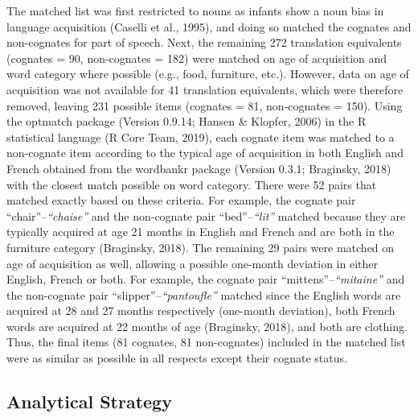 \documentclass[
  english,
  ,man,floatsintext]{apa6}
\begin{document}
The matched list was first restricted to nouns as infants show a noun bias in language acquisition (Caselli et al., 1995), and doing so matched the cognates and non-cognates for part of speech. Next, the remaining 272 translation equivalents (cognates = 90, non-cognates = 182) were matched on age of acquisition and word category where possible (e.g., food, furniture, etc.). However, data on age of acquisition was not available for 41 translation equivalents, which were therefore removed, leaving 231 possible items (cognates = 81, non-cognates = 150). Using the optmatch package (Version 0.9.14; Hansen \& Klopfer, 2006) in the R statistical language (R Core Team, 2019), each cognate item was matched to a non-cognate item according to the typical age of acquisition in both English and French obtained from the wordbankr package (Version 0.3.1; Braginsky, 2018) with the closest match possible on word category. There were 52 pairs that matched exactly based on these criteria. For example, the cognate pair ``chair''--\emph{``chaise''} and the non-cognate pair ``bed''--\emph{``lit''} matched because they are typically acquired at age 21 months in English and French and are both in the furniture category (Braginsky, 2018). The remaining 29 pairs were matched on age of acquisition as well, allowing a possible one-month deviation in either English, French or both. For example, the cognate pair ``mittens''--\emph{``mitaine''} and the non-cognate pair ``slipper''--\emph{``pantoufle''} matched since the English words are acquired at 28 and 27 months respectively (one-month deviation), both French words are acquired at 22 months of age (Braginsky, 2018), and both are clothing. Thus, the final items (81 cognates, 81 non-cognates) included in the matched list were as similar as possible in all respects except their cognate status.

\hypertarget{analytical-strategy}{%
\subsection{Analytical Strategy}\label{analytical-strategy}}
\end{document}
